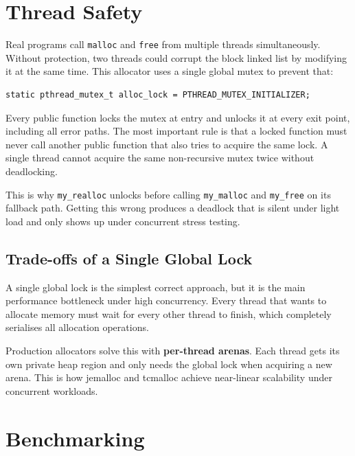 \documentclass[12pt, a4paper]{report}
\begin{document}
\chapter{Thread Safety}

Real programs call \texttt{malloc} and \texttt{free} from multiple threads
simultaneously. Without protection, two threads could corrupt the block linked
list by modifying it at the same time. This allocator uses a single global mutex
to prevent that:

\begin{lstlisting}
static pthread_mutex_t alloc_lock = PTHREAD_MUTEX_INITIALIZER;
\end{lstlisting}

Every public function locks the mutex at entry and unlocks it at every exit
point, including all error paths. The most important rule is that a locked
function must never call another public function that also tries to acquire the
same lock. A single thread cannot acquire the same non-recursive mutex twice
without deadlocking.

This is why \texttt{my\_realloc} unlocks before calling \texttt{my\_malloc} and
\texttt{my\_free} on its fallback path. Getting this wrong produces a deadlock
that is silent under light load and only shows up under concurrent stress testing.

\section{Trade-offs of a Single Global Lock}

A single global lock is the simplest correct approach, but it is the main
performance bottleneck under high concurrency. Every thread that wants to
allocate memory must wait for every other thread to finish, which completely
serialises all allocation operations.

Production allocators solve this with \textbf{per-thread arenas}. Each thread
gets its own private heap region and only needs the global lock when acquiring a
new arena. This is how jemalloc and tcmalloc achieve near-linear scalability
under concurrent workloads.

\chapter{Benchmarking}
\end{document}
